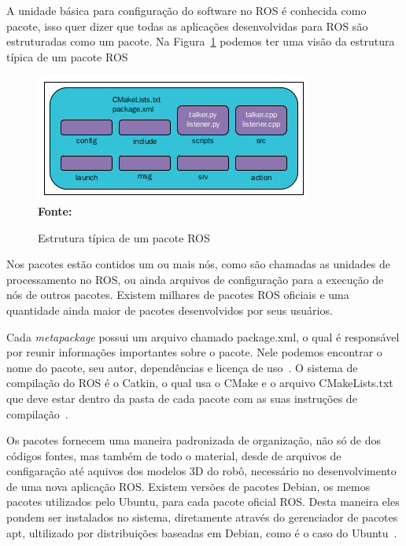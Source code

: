 A unidade básica para configuração do software no ROS é conhecida como pacote, isso quer dizer que todas as aplicações desenvolvidas para ROS são estruturadas como um pacote. Na Figura~\ref{fig:rospacotestrut} podemos ter uma visão da estrutura típica de um pacote ROS

\begin{figure}[ht]
	\caption{Estrutura típica de um pacote ROS}
	\begin{center}
		\includegraphics[scale=0.8]{imagens/rospackagestruture.png}\\
		{\small \textbf{Fonte:} }
    \end{center}\label{fig:rospacotestrut}
\end{figure}

Nos pacotes estão contidos um ou mais nós, como são chamadas as unidades de processamento no ROS, ou ainda arquivos de configuração para a execução de nós de outros pacotes. Existem milhares de pacotes ROS oficiais e uma quantidade ainda maior de pacotes desenvolvidos por seus usuários. 

Cada \textit{metapackage} possui um arquivo chamado package.xml, o qual é responsável por reunir informações importantes sobre o pacote. Nele podemos encontrar o nome do pacote, seu autor, dependências e licença de uso~\cite{RosMtaPkg}. O sistema de compilação do ROS é o Catkin, o qual usa o CMake e o arquivo CMakeLists.txt que deve estar dentro da pasta de cada pacote com as suas instruções de compilação~\cite{RosCatkin}. 

Os pacotes fornecem uma maneira padronizada de organização, não só de dos códigos fontes, mas também de todo o material, desde de arquivos de configaração até aquivos dos modelos 3D do robô, necessário no desenvolvimento de uma nova aplicação ROS\@. Existem versões de pacotes Debian, os memos pacotes utilizados pelo Ubuntu, para cada pacote oficial ROS\@. Desta maneira eles pondem ser instalados no sistema, diretamente através do gerenciador de pacotes apt, ultilizado por distribuições baseadas em Debian, como é o caso do Ubuntu~\cite{RosPKG}. 

